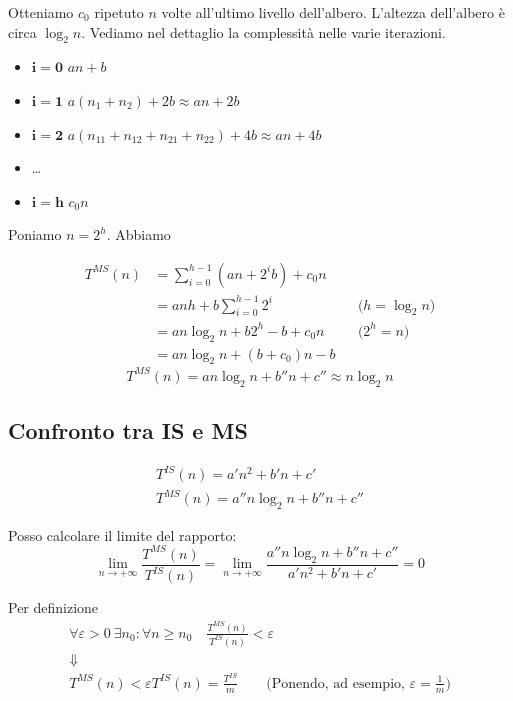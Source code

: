 Otteniamo $c_0$ ripetuto $n$ volte all'ultimo livello dell'albero. L'altezza dell'albero è circa 
$\log_2 n$. Vediamo nel dettaglio la complessità nelle varie iterazioni.
\begin{itemize}
	\item[] $\boldsymbol{i=0}$ \hspace{0.5cm} $an+b$
	\item[] $\boldsymbol{i=1}$ \hspace{0.5cm} $a(n_1+n_2)+2b \approx an+2b$
	\item[] $\boldsymbol{i=2}$ \hspace{0.5cm} $a(n_{11}+n_{12}+n_{21}+n_{22})+4b \approx an+4b$
	\item[] \dots
	\item[] $\boldsymbol{i=h}$ \hspace{0.5cm} $c_0n$
\end{itemize}

Poniamo $n=2^h$. Abbiamo

\begin{align*}
	T^{MS}(n) 	& = \displaystyle\sum_{i=0}^{h-1}(an+2^ib)+c_0n \\
				& = anh+b\displaystyle\sum_{i=0}^{h-1}2^i && \text{($h= \log_2n$)}\\
				& = an \log_2n + b2^h - b + c_0n && \text{($2^h=n$)} \\
				& = an \log_2n + (b+c_0)n - b
\end{align*}
\begin{displaymath}
	T^{MS}(n) = an \log_2n + b''n + c'' \approx n \log_2n
\end{displaymath}

\subsection{Confronto tra IS e MS}

\begin{gather*}
	T^{IS}(n) = a'n^2 + b'n + c' \\
	T^{MS}(n) = a''n \log_2n + b''n + c''
\end{gather*}

Posso calcolare il limite del rapporto:
\begin{displaymath}
	\lim_{n \to +\infty} \frac{T^{MS}(n)}{T^{IS}(n)} = \lim_{n \to +\infty} \frac{a''n \log_2n + b''n + c''}{a'n^2 + b'n + c'} = 0
\end{displaymath}

Per definizione
\begin{gather*}
	\forall \varepsilon > 0 \ \exists n_0 : \forall n \geq n_0 \quad \frac{T^{MS}(n)}{T^{IS}(n)} < \varepsilon \\
	\Downarrow \\
	T^{MS}(n) < \varepsilon T^{IS}(n) = \frac{T^{IS}}{m} \qquad \text{(Ponendo, ad esempio, $\varepsilon = \frac{1}{m}$)}
\end{gather*}

